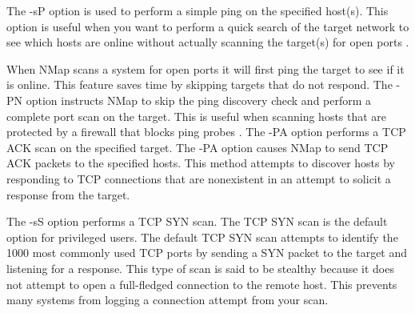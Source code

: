 \documentclass[12pt]{article}
\begin{document}
The -sP option is used to perform a simple ping on the specified host(s). This option is useful when you want to perform a quick search of the target network to see which hosts are online without actually scanning the target(s) for open ports \cite{cookbook}.
\\
\par When  NMap scans a system for open ports it will first ping the target to see if it is online. This feature saves time by skipping targets that do not respond. The -PN option instructs  NMap to skip the ping discovery check and perform a complete port scan on the target. This is useful when scanning hosts that are protected by a firewall that blocks ping probes \cite{ NMap}. The -PA option performs a TCP ACK scan on the specified target. The -PA option causes  NMap to send TCP ACK packets to the specified hosts. This method attempts to discover hosts by responding to TCP connections that are nonexistent in an attempt to solicit a response from the target.\cite{INmap} 
\\
\par The -sS option performs a TCP SYN scan. The TCP SYN scan is the default option for privileged users. The default TCP SYN scan attempts to identify the 1000 most commonly used TCP ports by sending a SYN packet to the target and listening for a response. This type of scan is said to be stealthy because it does not attempt to open a full-fledged connection to the remote host. This prevents many systems from logging a connection attempt from your scan.\cite{cookbook}
\end{document}
